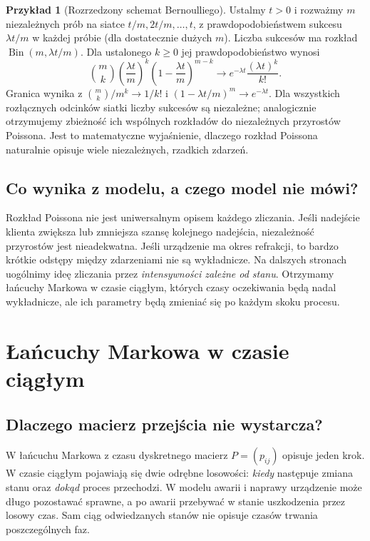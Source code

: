 \documentclass[11pt,a4paper,oneside]{report}
\numberwithin{equation}{chapter}
\theoremstyle{plain}
\theoremstyle{definition}
\newtheorem{przyklad}{Przykład}[chapter]
\theoremstyle{remark}
\begin{document}
\begin{przyklad}[Rozrzedzony schemat Bernoulliego]
Ustalmy $t>0$ i rozważmy $m$ niezależnych prób
na siatce $t/m,2t/m,\ldots,t$, z prawdopodobieństwem
sukcesu $\lambda t/m$ w każdej próbie (dla dostatecznie
dużych $m$). Liczba sukcesów ma rozkład
$\operatorname{Bin}(m,\lambda t/m)$.
Dla ustalonego $k\ge0$ jej prawdopodobieństwo wynosi
\[
\binom mk\left(\frac{\lambda t}{m}\right)^k
\left(1-\frac{\lambda t}{m}\right)^{m-k}
\longrightarrow e^{-\lambda t}\frac{(\lambda t)^k}{k!}.
\]
Granica wynika z
$\binom mk/m^k\to1/k!$ i
$(1-\lambda t/m)^m\to e^{-\lambda t}$.
Dla wszystkich rozłącznych odcinków siatki liczby
sukcesów są niezależne; analogicznie otrzymujemy
zbieżność ich wspólnych rozkładów do niezależnych
przyrostów Poissona. Jest to matematyczne wyjaśnienie,
dlaczego rozkład Poissona naturalnie opisuje wiele
niezależnych, rzadkich zdarzeń.
\end{przyklad}

\section{Co wynika z modelu, a czego model nie mówi?}
Rozkład Poissona nie jest uniwersalnym opisem każdego
zliczania. Jeśli nadejście klienta zwiększa lub zmniejsza
szansę kolejnego nadejścia, niezależność przyrostów jest
nieadekwatna. Jeśli urządzenie ma okres refrakcji, to
bardzo krótkie odstępy między zdarzeniami nie są wykładnicze.
Na dalszych stronach uogólnimy ideę zliczania przez
\emph{intensywności zależne od stanu}. Otrzymamy łańcuchy
Markowa w czasie ciągłym, których czasy oczekiwania będą
nadal wykładnicze, ale ich parametry będą zmieniać się
po każdym skoku procesu.
\chapter{Łańcuchy Markowa w czasie ciągłym}
\label{ch:ctmc}

\section{Dlaczego macierz przejścia nie wystarcza?}
W łańcuchu Markowa z czasu dyskretnego macierz $P=(p_{ij})$
opisuje jeden krok. W czasie ciągłym pojawiają się dwie odrębne
losowości: \emph{kiedy} następuje zmiana stanu oraz \emph{dokąd}
proces przechodzi. W modelu awarii i naprawy urządzenie może długo
pozostawać sprawne, a po awarii przebywać w stanie uszkodzenia
przez losowy czas. Sam ciąg odwiedzanych stanów nie opisuje
czasów trwania poszczególnych faz.
\end{document}
